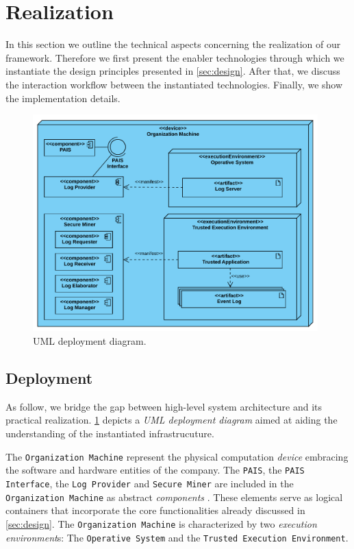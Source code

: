 \section{Realization}
In this section we outline the technical aspects concerning the realization of our framework. Therefore we first present the enabler technologies through which we instantiate the design principles presented in \cref{sec:design}. After that, we discuss the interaction workflow between the instantiated technologies. Finally, we show the implementation details.
\begin{figure}[t]
\centering
\includegraphics[width=11cm]{content/figures/deployment_diagram.pdf}
\caption{UML deployment diagram.}
\label{fig:deployment_diagram}
\end{figure}
\subsection{Deployment}
As follow, we bridge the gap between high-level system architecture and its practical realization. \cref{fig:deployment_diagram} depicts a \textit{UML deployment diagram} \cite{koch2002expressive} aimed at aiding the understanding of the instantiated infrastrucuture. 

The \texttt{Organization Machine} represent the physical computation \textit{device} embracing the software and hardware entities of the company. The \texttt{PAIS}, the \texttt{PAIS Interface}, the \texttt{Log Provider} and \texttt{Secure Miner} are included in the \texttt{Organization Machine} as abstract \textit{components} . These elements serve as logical containers that incorporate the core functionalities already discussed in \cref{sec:design}. The \texttt{Organization Machine} is characterized by two \textit{execution environment}s: The \texttt{Operative System} and the \texttt{Trusted Execution Environment}.

